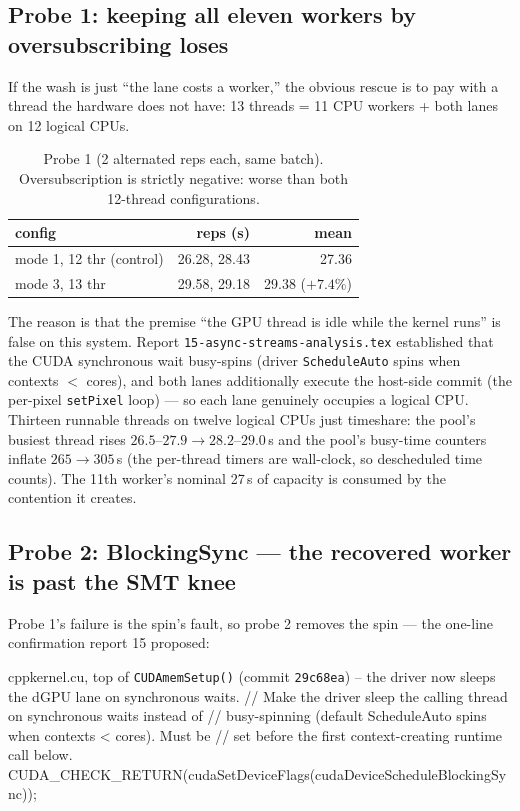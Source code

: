 \documentclass[
	english,
	letterpaper, oneside
]{article}
\begin{document}
\subsection{Probe 1: keeping all eleven workers by oversubscribing loses}

If the wash is just ``the lane costs a worker,'' the obvious rescue is to
pay with a thread the hardware does not have: 13 threads = 11 CPU workers
+ both lanes on 12 logical CPUs.

\begin{table}[H]
\centering
\caption{Probe 1 (2 alternated reps each, same batch). Oversubscription is
strictly negative: worse than both 12-thread configurations.\label{tab:probe1}}
\begin{tabular}{lrr}
\toprule
config & reps (s) & mean \\
\midrule
mode 1, 12 thr (control) & 26.28, 28.43 & 27.36 \\
mode 3, 13 thr & 29.58, 29.18 & 29.38 ($+7.4\%$) \\
\bottomrule
\end{tabular}
\end{table}

The reason is that the premise ``the GPU thread is idle while the kernel
runs'' is false on this system. Report
\texttt{15-async-streams-analysis.tex} established that the CUDA
synchronous wait busy-spins (driver \texttt{ScheduleAuto} spins when
contexts $<$ cores), and both lanes additionally execute the host-side
commit (the per-pixel \texttt{setPixel} loop) --- so each lane genuinely
occupies a logical CPU. Thirteen runnable threads on twelve logical CPUs
just timeshare: the pool's busiest thread rises $26.5$--$27.9\to
28.2$--$29.0$\,s and the pool's busy-time counters inflate $265\to305$\,s
(the per-thread timers are wall-clock, so descheduled time counts). The 11th
worker's nominal 27\,s of capacity is consumed by the contention it creates.

\subsection{Probe 2: BlockingSync --- the recovered worker is past the SMT knee}
\label{sec:probe2}

Probe 1's failure is the spin's fault, so probe 2 removes the spin --- the
one-line confirmation report 15 proposed:

\begin{sourcecode}{cpp}{kernel.cu, top of \texttt{CUDAmemSetup()} (commit \texttt{29c68ea}) -- the driver now sleeps the dGPU lane on synchronous waits.}
// Make the driver sleep the calling thread on synchronous waits instead of
// busy-spinning (default ScheduleAuto spins when contexts < cores). Must be
// set before the first context-creating runtime call below.
CUDA_CHECK_RETURN(cudaSetDeviceFlags(cudaDeviceScheduleBlockingSync));
\end{sourcecode}
\end{document}
